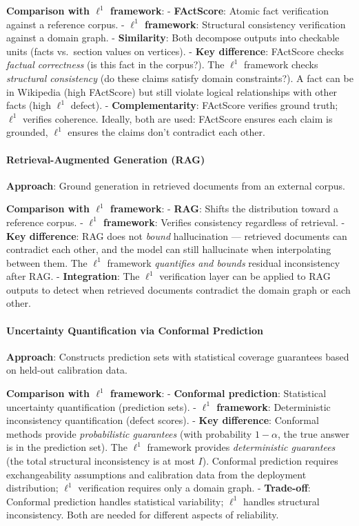 \documentclass[
]{article}
\begin{document}
\textbf{Comparison with \(\ell^1\) framework}: - \textbf{FActScore}:
Atomic fact verification against a reference corpus. -
\textbf{\(\ell^1\) framework}: Structural consistency verification
against a domain graph. - \textbf{Similarity}: Both decompose outputs
into checkable units (facts vs.~section values on vertices). -
\textbf{Key difference}: FActScore checks \emph{factual correctness} (is
this fact in the corpus?). The \(\ell^1\) framework checks
\emph{structural consistency} (do these claims satisfy domain
constraints?). A fact can be in Wikipedia (high FActScore) but still
violate logical relationships with other facts (high \(\ell^1\) defect).
- \textbf{Complementarity}: FActScore verifies ground truth; \(\ell^1\)
verifies coherence. Ideally, both are used: FActScore ensures each claim
is grounded, \(\ell^1\) ensures the claims don't contradict each other.

\paragraph{Retrieval-Augmented Generation
(RAG)}\label{retrieval-augmented-generation-rag}

\textbf{Approach}: Ground generation in retrieved documents from an
external corpus.

\textbf{Comparison with \(\ell^1\) framework}: - \textbf{RAG}: Shifts
the distribution toward a reference corpus. - \textbf{\(\ell^1\)
framework}: Verifies consistency regardless of retrieval. - \textbf{Key
difference}: RAG does not \emph{bound} hallucination --- retrieved
documents can contradict each other, and the model can still hallucinate
when interpolating between them. The \(\ell^1\) framework
\emph{quantifies and bounds} residual inconsistency after RAG. -
\textbf{Integration}: The \(\ell^1\) verification layer can be applied
to RAG outputs to detect when retrieved documents contradict the domain
graph or each other.

\paragraph{Uncertainty Quantification via Conformal
Prediction}\label{uncertainty-quantification-via-conformal-prediction}

\textbf{Approach}: Constructs prediction sets with statistical coverage
guarantees based on held-out calibration data.

\textbf{Comparison with \(\ell^1\) framework}: - \textbf{Conformal
prediction}: Statistical uncertainty quantification (prediction sets). -
\textbf{\(\ell^1\) framework}: Deterministic inconsistency
quantification (defect scores). - \textbf{Key difference}: Conformal
methods provide \emph{probabilistic guarantees} (with probability
\(1-\alpha\), the true answer is in the prediction set). The \(\ell^1\)
framework provides \emph{deterministic guarantees} (the total structural
inconsistency is at most \(I\)). Conformal prediction requires
exchangeability assumptions and calibration data from the deployment
distribution; \(\ell^1\) verification requires only a domain graph. -
\textbf{Trade-off}: Conformal prediction handles statistical
variability; \(\ell^1\) handles structural inconsistency. Both are
needed for different aspects of reliability.
\end{document}
